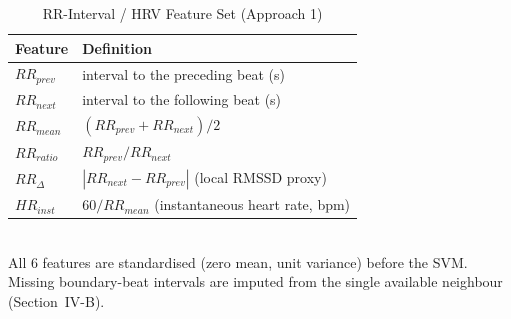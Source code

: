 \begin{table}[t]
\caption{RR-Interval / HRV Feature Set (Approach 1)}
\label{tab:hrv}
\centering
\begin{tabular}{ll}
\toprule
\textbf{Feature} & \textbf{Definition} \\
\midrule
$RR_{prev}$ & interval to the preceding beat (s) \\
$RR_{next}$ & interval to the following beat (s) \\
$RR_{mean}$ & $(RR_{prev}+RR_{next})/2$ \\
$RR_{ratio}$ & $RR_{prev}/RR_{next}$ \\
$RR_{\Delta}$ & $|RR_{next}-RR_{prev}|$ (local RMSSD proxy) \\
$HR_{inst}$ & $60/RR_{mean}$ (instantaneous heart rate, bpm) \\
\bottomrule
\end{tabular}
\\[4pt]
\footnotesize All 6 features are standardised (zero mean, unit variance) before
the SVM. Missing boundary-beat intervals are imputed from the single
available neighbour (Section~IV-B).
\end{table}
